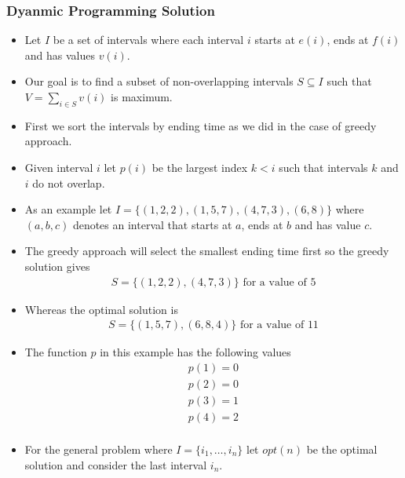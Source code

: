 \documentclass{beamer}
\begin{document}
\begin{frame}
  \frametitle{Dyanmic Programming Solution}
  
  \begin{itemize}
  \item Let $I$ be a set of intervals where each interval $i$ starts at $e(i)$, ends at $f(i)$ and has values $v(i)$.
  \item Our goal is to find a subset of non-overlapping intervals  $S\subseteq I$ such that $V=\sum_{i\in S}v(i)$ is maximum.
   \item First we sort the intervals by ending time as we did in the case of greedy approach.
  \item Given interval $i$ let $p(i)$ be the largest index $k<i$ such that intervals $k$ and $i$ do not overlap.
  \item As an example let $I=\{(1,2,2),(1,5,7),(4,7,3),(6,8)\}$ where $(a,b,c)$ denotes an interval that starts at $a$, ends at $b$ and has value $c$.
  \item The greedy approach will select the smallest ending time first so the greedy solution gives 
    \begin{align*}
      S=\{(1,2,2),(4,7,3)\}\text{ for a value of } 5
    \end{align*}
\end{itemize}
\end{frame}

\begin{frame}
\begin{itemize}
\item Whereas the optimal solution  is
  \begin{align*}
      S=\{(1,5,7),(6,8,4)\}\text{ for a value of } 11
  \end{align*}
\item The function $p$ in this example has the following values
  \begin{align*}
    p(1)=0\\
    p(2)=0\\
   p(3)=1\\
   p(4)=2\\
  \end{align*}

\item For the general problem where $I=\{i_1,\ldots,i_n\}$ let $opt(n)$ be the optimal solution and consider the last interval $i_n$. 
\end{itemize}
\end{frame}
\end{document}
